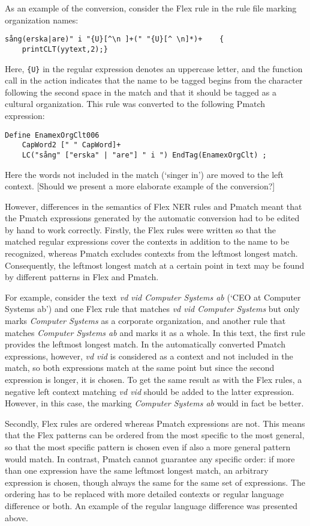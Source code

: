 \documentclass{llncs}
\begin{document}
As an example of the conversion, consider the Flex rule in the rule
file marking organization names:
\begin{verbatim}
sång(erska|are)" i "{U}[^\n ]+(" "{U}[^ \n]*)+    {
    printCLT(yytext,2);}
\end{verbatim}
Here, \texttt{\{U\}} in the regular expression denotes an uppercase
letter, and the function call in the action indicates that the name to
be tagged begins from the character following the second space in the
match and that it should be tagged as a cultural organization. This
rule was converted to the following Pmatch expression:
\begin{verbatim}
Define EnamexOrgClt006
    CapWord2 [" " CapWord]+
    LC("sång" ["erska" | "are"] " i ") EndTag(EnamexOrgClt) ;
\end{verbatim}
Here the words not included in the match (`singer in') are moved to
the left context. \textsf{[Should we present a more elaborate example
  of the conversion?]}

However, differences in the semantics of Flex NER rules and Pmatch
meant that the Pmatch expressions generated by the automatic
conversion had to be edited by hand to work correctly. Firstly, the
Flex rules were written so that the matched regular expressions cover
the contexts in addition to the name to be recognized, whereas Pmatch
excludes contexts from the leftmost longest match. Consequently, the
leftmost longest match at a certain point in text may be found by
different patterns in Flex and Pmatch.

For example, consider the text \textit{vd vid Computer Systems ab}
(`CEO at Computer Systems ab') and one Flex rule that matches
\textit{vd vid Computer Systems} but only marks \textit{Computer
  Systems} as a corporate organization, and another rule that matches
\textit{Computer Systems ab} and marks it as a whole. In this text,
the first rule provides the leftmost longest match. In the
automatically converted Pmatch expressions, however, \textit{vd vid}
is considered as a context and not included in the match, so both
expressions match at the same point but since the second expression is
longer, it is chosen. To get the same result as with the Flex rules, a
negative left context matching \textit{vd vid} should be added to the
latter expression. However, in this case, the marking \textit{Computer
  Systems ab} would in fact be better.

Secondly, Flex rules are ordered whereas Pmatch expressions are not.
This means that the Flex patterns can be ordered from the most
specific to the most general, so that the most specific pattern is
chosen even if also a more general pattern would match. In contrast,
Pmatch cannot guarantee any specific order: if more than one
expression have the same leftmost longest match, an arbitrary
expression is chosen, though always the same for the same set of
expressions. The ordering has to be replaced with more detailed
contexts or regular language difference or both. An example of the
regular language difference was presented above.
\end{document}
